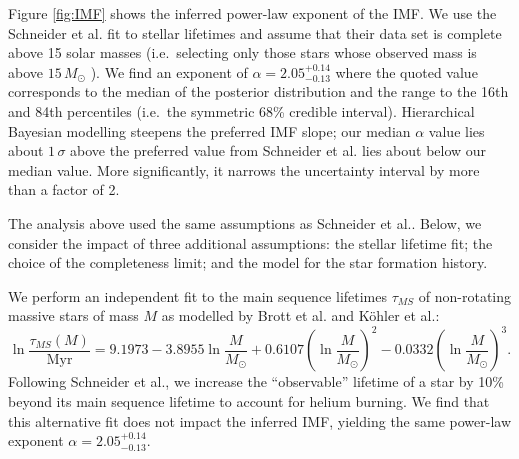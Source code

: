 \documentclass[12pt]{article}
\newcommand{\onesigrange}[3]{\ensuremath{#1^{+#2}_{-#3}}}
\newcommand{\alpharangeone}{\onesigrange{2.05}{0.14}{0.13}}
\newcommand{\alpharangetwo}{\onesigrange{2.05}{0.14}{0.13}}
\begin{document}
Figure \ref{fig:IMF} shows the inferred power-law exponent of the IMF.   We use the Schneider et al.\cite{Schneider:2018}  fit to stellar lifetimes and assume
that their data set is complete above 15 solar masses (i.e.\ selecting only
those stars whose observed mass is above $15 \, M_\odot$
\cite{Loredo:2004,BBH:O1}).  We find
an exponent of $\alpha=\alpharangeone$ where the quoted value corresponds to the median
of the posterior distribution and the range to the 16th and 84th percentiles
(i.e.\ the symmetric 68\% credible interval).  %
Hierarchical Bayesian modelling steepens the preferred IMF
slope; our median $\alpha$ value lies about $1\, \sigma$ above the preferred value from
Schneider et al.\cite{Schneider:2018} lies about  below our median value.  More significantly, it narrows the uncertainty interval by more than a factor of 2.

The analysis above used the same assumptions as Schneider et al.\cite{Schneider:2018}.  Below, we consider the impact of three additional  assumptions: the stellar lifetime fit; the choice of the completeness limit; and the model for the star formation history.

We perform an independent fit to the main sequence lifetimes
$\tau_{MS}$ of non-rotating massive stars of mass $M$ as modelled by Brott et al.\cite{Brott:2011} and K\"{o}hler et al.\cite{Kohler:2015}:
%
\begin{equation}
\ln \frac{\tau_{MS} (M)}{\textrm{Myr}} = 9.1973 - 3.8955 \ln\frac{M}{M_\odot} %
+ 0.6107 \left(\ln\frac{M}{M_\odot} \right)^2 - 0.0332 \left(\ln\frac{M}{M_\odot}\right)^3.
\end{equation}
Following Schneider et al.\cite{Schneider:2018}, we increase the ``observable''
lifetime of a star by 10\% beyond its main sequence lifetime to account for
helium burning.  We find that this alternative fit does not impact the inferred IMF, yielding the same power-law exponent $\alpha=\alpharangetwo$.
\end{document}
